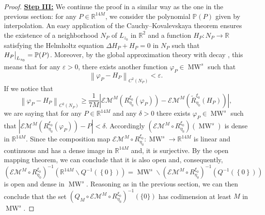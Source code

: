 \documentclass{amsart}
\theoremstyle{definition}
\theoremstyle{remark}
\newcommand{\de}{\delta}
\newcommand{\ep}{\varepsilon}
\def\RR{\mathbb{R}}
\renewcommand\geq\geqslant
\numberwithin{equation}{section}
\theoremstyle{definition}
\theoremstyle{remark}
\def\RR{\mathbb{R}}
\DeclareMathOperator\MW{MW}
\newcommand\restr[2]{{%
		\left.\kern-\nulldelimiterspace 
		#1 
		\vphantom{\big|} 
		\right|_{#2} }}
\begin{document}
\begin{proof}
	
 \textbf{	\underline{Step III:}}  We continue the proof in a similar way as the one in the previous section:  for any $P\in \RR^{14M}$, we consider the polynomial $\mathbb{P}(P)$ given by interpolation. 	An easy application of the Cauchy–Kovalevskaya theorem ensures the existence of a neighborhood $N_P$ of $L_{z_0}$ in $\mathbb{R}^{2}$ and a function $H_P:N_P\rightarrow\mathbb{R}$ satisfying the Helmholtz equation $\Delta H_P+H_P=0$ in $N_P$ such that $\restr{H_P}{L_{z_0}}=\mathbb{P}(P)$. Moreover, by the global approximation theory with decay \cite{APDE}, this means that for any $\ep>0$, there exists another function $\varphi_P\in\MW^s$ such that \begin{equation}
		\left\|\varphi_P-H_P\right\|_{C^2\left(N_P\right)}<\ep.
	\end{equation}If we notice that
	\begin{equation}
		\left\|\varphi_P-H_P\right\|_{C^2\left(N_P\right)}\geq\frac{1}{7M} \left|\mathcal{EM}^M\left(R_{\eta_0}^{\xi_0}\left(\varphi_P\right)\right)-\mathcal{EM}^M\left(\tilde{R}_{\eta_0}^{\xi_0}\left(H_P\right)\right)\right|,
	\end{equation}we are saying that for any $P\in\mathbb{R}^{14M}$ and any $\de>0$ there exists $\varphi_P\in \MW^s$ such that $\left|\mathcal{EM}^M\left(R_{\eta_0}^{\xi_0}\left(\varphi_P\right)\right)-P\right|<\de.$ Accordingly $\left(\mathcal{EM}^M\circ R_{\eta_0}^{\xi_0}\right)\left(\MW^s\right)$ is dense in $\mathbb{R}^{14M}$. Since the composition map $\mathcal{EM}^M\circ	R_{\eta_0}^{\xi_0}:\MW^s\rightarrow\mathbb{R}^{14M}$ is linear and continuous and has a dense image in $\mathbb{R}^{14M}$ and, it is surjective. By the open mapping theorem, we can conclude that it is also open and, consequently, $\left(\mathcal{EM}^M\circ	R_{\eta_0}^{\xi_0}\right)^{-1}\left(\mathbb{R}^{14M}\backslash Q^{-1}\left(\left\{0\right\}\right)\right)=\MW^s\backslash\left(\mathcal{EM}^M\circ	R_{\eta_0}^{\xi_0}\right)^{-1}\left( Q^{-1}\left(\left\{0\right\}\right)\right)$ is open and dense in $\MW^s$. Reasoning as in the previous section,  we can then conclude that the set $\left(Q_M\circ\mathcal{EM}^M\circ R_{\eta_0}^{\xi_0}\right)^{-1}\left(\{0\}\right)$ has codimension at least $M$ in $\MW^s$.
	

\end{proof}
\end{document}
